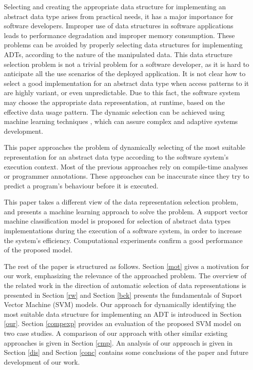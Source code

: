 Selecting and creating the appropriate data structure for implementing an abstract data type arises from practical needs, it has a major importance for software developers. Improper use of data structures in software applications leads to performance degradation and improper memory consumption. These problems can be avoided by properly selecting data structures for implementing ADTs, according to the nature of the manipulated data. This data structure selection problem is not a trivial problem for a software developer, as it is hard to anticipate all the use scenarios of the deployed application. It is not clear how to select a good implementation for an abstract data type when access patterns to it are
highly variant, or even unpredictable. Due to this fact, the software system may choose the appropriate data representation, at runtime, based on the effective data usage pattern. The dynamic selection can be achieved using machine learning techniques \cite{mitchell}, which can assure complex and adaptive systems development. 

This paper approaches the problem of dynamically selecting of the most suitable representation for an abstract data type according to the software system's execution context. Most of the previous approaches rely on compile-time analyses or programmer annotations. These
approaches can be inaccurate since they try to predict
a program's behaviour before it is executed. 

This paper takes a different view of the data representation
selection problem, and presents a machine learning approach
to solve the problem. A support vector machine classification model is proposed for selection of abstract data types implementations during the execution of a software system, in order to increase the system's efficiency. Computational experiments confirm a good performance of the proposed model. 

The rest of the paper is structured as follows. Section \ref{mot} gives a motivation for our work, emphasizing the relevance of the approached problem. The overview of the related work in the direction of automatic selection of data representations is presented in Section \ref{rw} and Section \ref{bck} presents the fundamentals of  Suport Vector Machine (SVM) models.  Our approach for
dynamically identifying the most suitable data structure for implementing an ADT is introduced in Section \ref{our}. Section \ref{compexp} provides an  evaluation of the proposed SVM model on two case studies. A comparison of our approach with other
similar existing approaches is given in Section \ref{cmp}. An analysis of our approach is given in Section \ref{dis} and Section
\ref{conc} contains some conclusions of the paper and future
development of our work.



